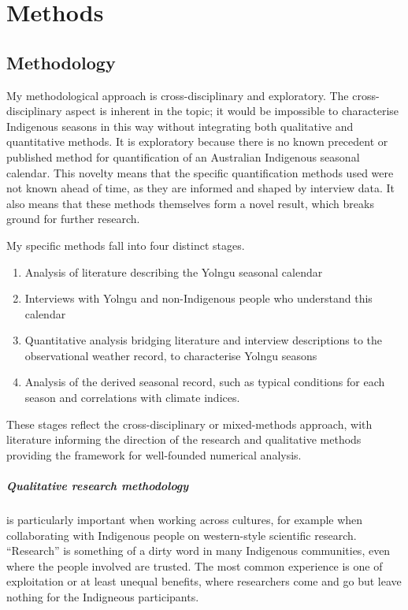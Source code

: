 \chapter{Methods}
\label{ch:methods}

\section{Methodology}

My methodological approach is cross-disciplinary and exploratory.
%
The cross-disciplinary aspect is inherent in the topic; it would
be impossible to characterise Indigenous seasons in this way without
integrating both qualitative and quantitative methods.
%
It is exploratory because there is no known precedent or published
method for quantification of an Australian Indigenous seasonal calendar.
This novelty means that the specific quantification methods used
were not known ahead of time, as they are informed and shaped by
interview data.  It also means that these methods themselves form
a novel result, which breaks ground for further research.

My specific methods fall into four distinct stages.
\begin{enumerate}
\item Analysis of literature describing the Yolngu seasonal calendar
\item Interviews with Yolngu and non-Indigenous people who
    understand this calendar
\item Quantitative analysis bridging literature and interview
    descriptions to the observational weather record, to characterise
    Yolngu seasons
\item Analysis of the derived seasonal record, such as typical
    conditions for each season and correlations with climate indices.
\end{enumerate}
These stages reflect the cross-disciplinary or mixed-methods approach,
with literature informing the direction of the research and qualitative
methods providing the framework for well-founded numerical analysis.


\paragraph{Qualitative research methodology} is particularly important
when working across cultures, for example when collaborating with
Indigenous people on western-style scientific research.
%
``Research'' is something of a dirty word in many Indigenous communities,
even where the people involved are trusted.  The most common experience
is one of exploitation or at least unequal benefits, where researchers
come and go but leave nothing for the Indigneous participants.

